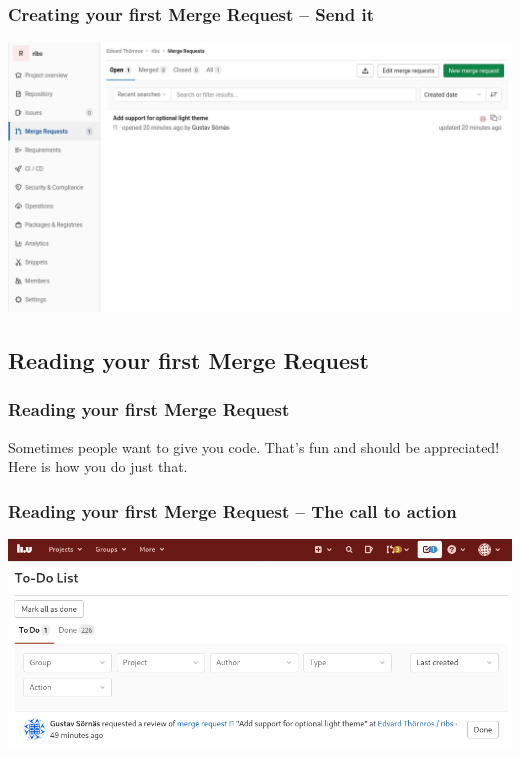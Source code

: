 \documentclass{beamer}
\begin{document}
\begin{frame}[fragile]
  \frametitle{Creating your first Merge Request -- Send it}
  \includegraphics[width=\linewidth]{merge-request/mr-menu-created.png}
\end{frame}

\subsection{Reading your first Merge Request}

\begin{frame}[fragile]
  \frametitle{Reading your first Merge Request}

  Sometimes people want to give you code. That's fun and should be appreciated! \\[1em]
  Here is how you do just that.

\end{frame}

\begin{frame}[fragile]
  \frametitle{Reading your first Merge Request -- The call to action}
  \includegraphics[width=\linewidth]{gitlab-first-review/01-notification.png}
\end{frame}
\end{document}
